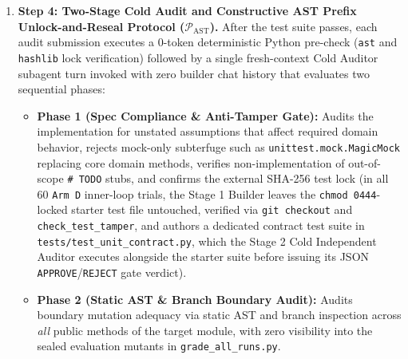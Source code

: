 \documentclass[11pt,a4paper,copyright]{google}
\begin{document}
\begin{enumerate}[leftmargin=1.5em,itemsep=3pt,topsep=3pt]
  \item \textbf{Step 4: Two-Stage Cold Audit and Constructive AST Prefix Unlock-and-Reseal Protocol ($\mathcal{P}_{\text{AST}}$).} After the test suite passes, each audit submission executes a 0-token deterministic Python pre-check (\texttt{ast} and \texttt{hashlib} lock verification) followed by a single fresh-context Cold Auditor subagent turn invoked with zero builder chat history \cite{rensin2026elephant,kenton2026debate,sahoo2025double} that evaluates two sequential phases:
  \begin{itemize}[leftmargin=1.5em,itemsep=1pt,topsep=1pt]
    \item \textbf{Phase 1 (Spec Compliance \& Anti-Tamper Gate):} Audits the implementation for unstated assumptions that affect required domain behavior, rejects mock-only subterfuge such as \texttt{unittest.mock.MagicMock} replacing core domain methods, verifies non-implementation of out-of-scope \texttt{\# TODO} stubs, and confirms the external SHA-256 test lock (in all 60 \texttt{Arm D} inner-loop trials, the Stage 1 Builder leaves the \texttt{chmod 0444}-locked starter test file untouched, verified via \texttt{git checkout} and \texttt{check\_test\_tamper}, and authors a dedicated contract test suite in \texttt{tests/\allowbreak test\_unit\_contract.py}, which the Stage 2 Cold Independent Auditor executes alongside the starter suite before issuing its JSON \texttt{APPROVE}/\texttt{REJECT} gate verdict).
    \item \textbf{Phase 2 (Static AST \& Branch Boundary Audit):} Audits boundary mutation adequacy via static AST and branch inspection across \emph{all} public methods of the target module, with zero visibility into the sealed evaluation mutants in \texttt{grade\_all\_runs.py}.
  \end{itemize}

\end{enumerate}
\end{document}
